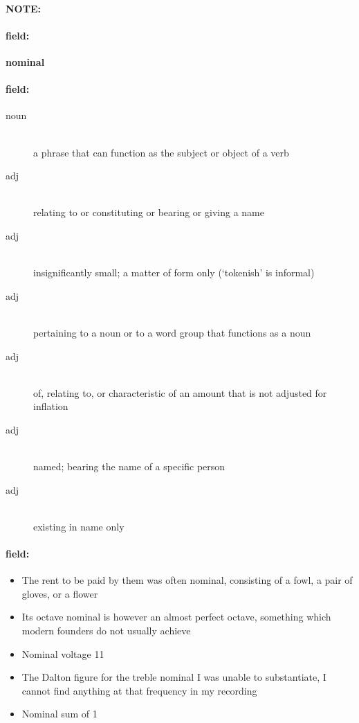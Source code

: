 \documentclass[12pt]{article}
\newenvironment{note}{\paragraph{NOTE:}}{}
\newenvironment{field}{\paragraph{field:}}{}
\begin{document}
\begin{note}
\begin{field}
\textbf{\large nominal}
\end{field}


\begin{field}
\begin{description}
\item[noun] \hfill \\ 
a phrase that can function as the subject or object of a verb

\item[adj] \hfill \\ 
relating to or constituting or bearing or giving a name

\item[adj] \hfill \\ 
insignificantly small; a matter of form only (`tokenish' is informal)

\item[adj] \hfill \\ 
pertaining to a noun or to a word group that functions as a noun

\item[adj] \hfill \\ 
of, relating to, or characteristic of an amount that is not adjusted for inflation

\item[adj] \hfill \\ 
named; bearing the name of a specific person

\item[adj] \hfill \\ 
existing in name only

\end{description}
\end{field}

\begin{field}
\begin{itemize}
\item The rent to be paid by them was often nominal, consisting of a fowl, a pair of gloves, or a flower
\item Its octave nominal is however an almost perfect octave, something which modern founders do not usually achieve
\item Nominal voltage 11
\item The Dalton figure for the treble nominal I was unable to substantiate, I cannot find anything at that frequency in my recording
\item Nominal sum of  1
\end{itemize}
\end{field}
\end{note}
\end{document}
